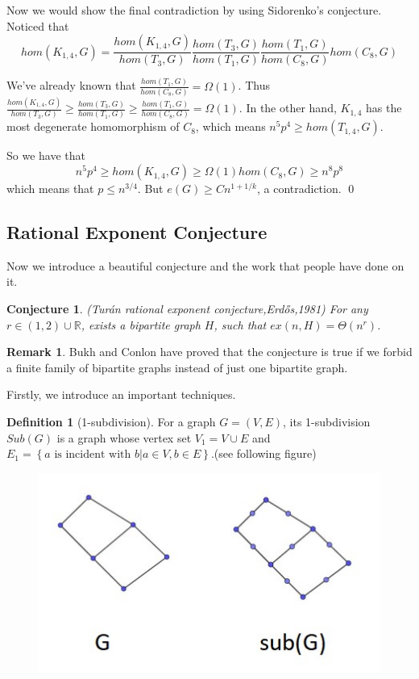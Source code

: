 \documentclass{article}
\newtheorem{conjecture}[theorem]{Conjecture}
\theoremstyle{definition}
\newtheorem{remark}[theorem]{Remark}
\newtheorem{definition}[theorem]{Definition}
\def\Erdos{Erd\H{o}s}
\def\Turan{Tur\'an}
\begin{document}
Now we would show the final contradiction by using Sidorenko's conjecture. Noticed that $$hom(K_{1,4},G)=\frac{hom(K_{1,4},G)}{hom(T_3,G)}\frac{hom(T_3,G)}{hom(T_1,G)}\frac{hom(T_1,G)}{hom(C_8,G)}hom(C_8,G)$$

We've already known that $\frac{hom(T_1,G)}{hom(C_8,G)}=\Omega(1)$. Thus $\frac{hom(K_{1,4},G)}{hom(T_3,G)}\ge \frac{hom(T_3,G)}{hom(T_1,G)}\ge \frac{hom(T_1,G)}{hom(C_8,G)}=\Omega(1)$. In the other hand, $K_{1,4}$ has the most degenerate homomorphism of $C_8$, which means $n^5p^4 \ge hom(T_{1,4},G)$. 

So we have that $$n^5p^4 \ge hom(K_{1,4},G)\ge\Omega(1)hom(C_8,G)\ge n^8p^8$$
which means that $p \le n^{3/4}$. But $e(G)\geq Cn^{1+1/k}$, a contradiction. \qed

\subsection{Rational Exponent Conjecture}

Now we introduce a beautiful conjecture and the work that people have done on it.

\begin{conjecture}(\Turan{} rational exponent conjecture,\Erdos{}\cite{erdosrationalconj},1981)
For any $r \in (1,2)\cup \mathbb{R}$, exists a bipartite graph $H$, such that $ex(n,H)=\Theta(n^r)$.
    
\end{conjecture}

\begin{remark}
    Bukh and Conlon\cite{BukhandConlon} have proved that the conjecture is true if we forbid a finite family of bipartite graphs instead of just one bipartite graph.
\end{remark}

Firstly, we introduce an important techniques.

\begin{definition}[1-subdivision]
    For a graph $G=(V,E)$, its 1-subdivision $Sub(G)$ is a graph whose vertex set $V_1=V\cup E$ and $E_1=\left \{ a\text{ is incident with }b|a\in V,b\in E\right \} $.(see following figure)
\end{definition}

\begin{figure}[H]
     \centering
     \includegraphics[scale=0.35]{12-3.jpg}
\end{figure}
\end{document}

